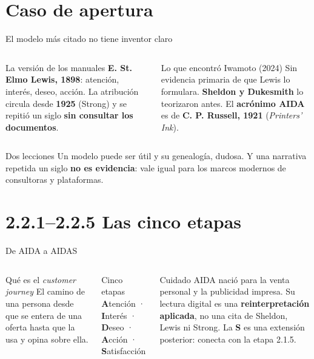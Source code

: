 \documentclass[aspectratio=169,xcolor=dvipsnames]{beamer}
\begin{document}
\section[Apertura]{Caso de apertura}

\begin{frame}{El modelo más citado no tiene inventor claro}
\begin{columns}[T]
  \begin{block}{La versión de los manuales}
    \small \textbf{E. St. Elmo Lewis, 1898}: atención, interés, deseo, acción. La atribución circula desde \textbf{1925} (Strong) y se repitió un siglo \textbf{sin consultar los documentos}.
  \end{block}
  \begin{alertblock}{Lo que encontró Iwamoto (2024)}
    \small Sin evidencia primaria de que Lewis lo formulara. \textbf{Sheldon y Dukesmith} lo teorizaron antes. El \textbf{acrónimo AIDA} es de \textbf{C. P. Russell, 1921} (\textit{Printers' Ink}).
  \end{alertblock}
\end{columns}
\vspace{6pt}
\begin{exampleblock}{Dos lecciones}
  \small Un modelo puede ser útil y su genealogía, dudosa. Y una narrativa repetida un siglo \textbf{no es evidencia}: vale igual para los marcos modernos de consultoras y plataformas.
\end{exampleblock}
\end{frame}

\section[AIDAS]{2.2.1--2.2.5 Las cinco etapas}

\begin{frame}{De AIDA a AIDAS}
\begin{columns}[T]
  \begin{block}{Qué es el \textit{customer journey}}
    \small El camino de una persona desde que se entera de una oferta hasta que la usa y opina sobre ella.
  \end{block}
  \begin{exampleblock}{Cinco etapas}
    \small \textbf{A}tención · \textbf{I}nterés · \textbf{D}eseo · \textbf{A}cción · \textbf{S}atisfacción
  \end{exampleblock}
  \begin{alertblock}{Cuidado}
    \scriptsize AIDA nació para la venta personal y la publicidad impresa. Su lectura digital es una \textbf{reinterpretación aplicada}, no una cita de Sheldon, Lewis ni Strong. La \textbf{S} es una extensión posterior: conecta con la etapa 2.1.5.
  \end{alertblock}
\end{columns}
\end{frame}
\end{document}
